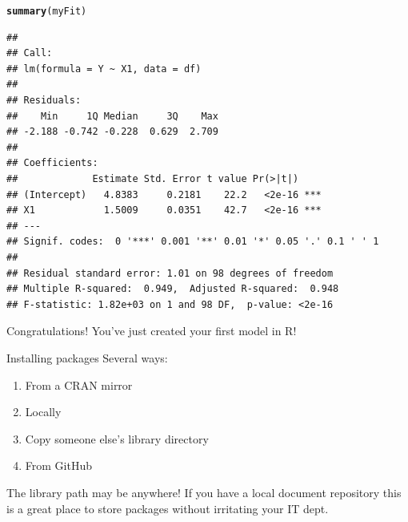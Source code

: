 \documentclass[xcolor=dvipsnames]{beamer}
\makeatletter
\newcommand{\hlstd}[1]{\textcolor[rgb]{0.345,0.345,0.345}{#1}}%
\newcommand{\hlkwd}[1]{\textcolor[rgb]{0.737,0.353,0.396}{\textbf{#1}}}%
\newenvironment{kframe}{%
 \def\at@end@of@kframe{}%
 \ifinner\ifhmode%
  \def\at@end@of@kframe{\end{minipage}}%
  \begin{minipage}{\columnwidth}%
 \fi\fi%
 \def\FrameCommand##1{\hskip\@totalleftmargin \hskip-\fboxsep
 \colorbox{shadecolor}{##1}\hskip-\fboxsep
     \hskip-\linewidth \hskip-\@totalleftmargin \hskip\columnwidth}%
 \MakeFramed {\advance\hsize-\width
   \@totalleftmargin\z@ \linewidth\hsize
   \@setminipage}}%
 {\par\unskip\endMakeFramed%
 \at@end@of@kframe}
\newenvironment{knitrout}{}{} %
\makeatother
\begin{document}
\begin{frame}[fragile]
\begin{knitrout}\tiny
{}\color{fgcolor}\begin{kframe}
\begin{alltt}
\hlkwd{summary}\hlstd{(myFit)}
\end{alltt}
\begin{verbatim}
## 
## Call:
## lm(formula = Y ~ X1, data = df)
## 
## Residuals:
##    Min     1Q Median     3Q    Max 
## -2.188 -0.742 -0.228  0.629  2.709 
## 
## Coefficients:
##             Estimate Std. Error t value Pr(>|t|)    
## (Intercept)   4.8383     0.2181    22.2   <2e-16 ***
## X1            1.5009     0.0351    42.7   <2e-16 ***
## ---
## Signif. codes:  0 '***' 0.001 '**' 0.01 '*' 0.05 '.' 0.1 ' ' 1
## 
## Residual standard error: 1.01 on 98 degrees of freedom
## Multiple R-squared:  0.949,	Adjusted R-squared:  0.948 
## F-statistic: 1.82e+03 on 1 and 98 DF,  p-value: <2e-16
\end{verbatim}
\end{kframe}
\end{knitrout}

\end{frame}

\begin{frame}
Congratulations! You've just created your first model in R!
\end{frame}

\begin{frame}{Installing packages}
Several ways: 
\begin{enumerate}
  \item From a CRAN mirror
  \item Locally
  \item Copy someone else's library directory
  \item From GitHub
\end{enumerate}
The library path may be anywhere! If you have a local document repository
this is a great place to store packages without irritating your IT dept.
\end{frame}
\end{document}

